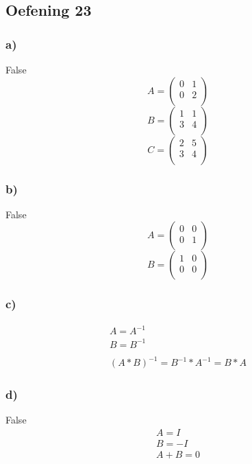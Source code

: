 \documentclass[lineaire_algebra_oplossingen.tex]{subfiles}
\begin{document}
\subsection{Oefening 23}
\subsubsection*{a)}
False
\[
A=\left(\begin{array}{cc}
    0 & 1\\
    0 & 2\\
\end{array} \right)
\]
\[
B=\left(\begin{array}{cc}
    1 & 1\\
    3 & 4\\
\end{array} \right)
\]
\[
C=\left(\begin{array}{cc}
    2 & 5\\
    3 & 4\\
\end{array} \right)
\]
\subsubsection*{b)}
 False
\[
A=\left(\begin{array}{cc}
    0 & 0\\
    0 & 1\\
\end{array} \right)
\]
\[
B=\left(\begin{array}{cc}
    1 & 0\\
    0 & 0\\
\end{array} \right)
\]
\subsubsection*{c)}
\begin{gather*}
A=A^{-1}\\
B=B^{-1}\\
\\
(A*B)^{-1}=B^{-1}*A^{-1}=B*A
\end{gather*}

\subsubsection*{d)}
False
\begin{gather*}
A=I\\
B=-I\\
A+B=0
\end{gather*}
\end{document}
